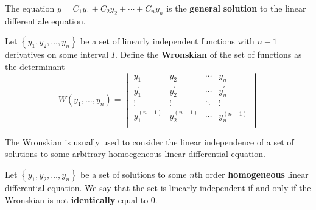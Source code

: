\begin{remark}
    The equation \( y = C_1 y_1 + C_2 y_2 + \cdots + C_n y_n\) is the \textbf{general} \textbf{solution} to the linear differentiale equation.
\end{remark}
\begin{definition}[Wronskian]
    Let \(\left\{ y_1,y_2,\ldots,y_n \right\}\) be a set of linearly independent functions with \(n-1\) derivatives on some interval \(I\). Define the \textbf{Wronskian} of the set of functions as the determinant 
    \[
        W(y_{1},\ldots,y_n )=\begin{vmatrix}
            y_1 &y_2  &\cdots  &y_n   \\
             y_1^{\prime} &y_2^{\prime}   &\cdots  &y_n^{\prime}    \\
             \vdots&\vdots  &\ddots  &\vdots   \\
             y_1^{(n-1)}& y_2^{(n-1)} &\cdots  &y_n^{(n-1)}   \\
        \end{vmatrix}
    \]
\end{definition}
The Wronskian is usually used to consider the linear independence of a set of solutions to some arbitrary homoegeneous linear differential equation. 
\begin{theorem}
    Let \(\left\{y_1,y_2,\ldots,y_n\right\}\) be a set of solutions to some \(n\)th order \textbf{homogeneous} linear differential equation. We say that the set is linearly independent if and only if the Wronskian is not \textbf{identically} equal to \(0\).
\end{theorem}
%

